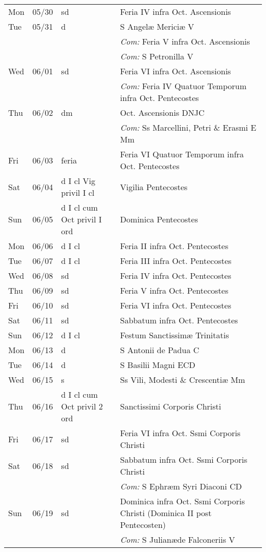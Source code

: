 \documentclass[10pt]{article}
\begin{document}
\begin{longtable}{ l l l l }
Mon & 05/30 & sd & Feria IV infra Oct. Ascensionis\\
Tue & 05/31 & d & S Angelæ Mericiæ V\\
 & & & \textit{Com:} Feria V infra Oct. Ascensionis\\
 & & & \textit{Com:} S Petronilla V\\
Wed & 06/01 & sd & Feria VI infra Oct. Ascensionis\\
 & & & \textit{Com:} Feria IV Quatuor Temporum infra Oct. Pentecostes\\
Thu & 06/02 & dm & Oct. Ascensionis DNJC\\
 & & & \textit{Com:} Ss Marcellini, Petri \& Erasmi E Mm\\
Fri & 06/03 & feria & Feria VI Quatuor Temporum infra Oct. Pentecostes\\
Sat & 06/04 & d I cl Vig privil I cl & Vigilia Pentecostes\\
Sun & 06/05 & d I cl cum Oct privil I ord & Dominica Pentecostes\\
Mon & 06/06 & d I cl & Feria II infra Oct. Pentecostes\\
Tue & 06/07 & d I cl & Feria III infra Oct. Pentecostes\\
Wed & 06/08 & sd & Feria IV infra Oct. Pentecostes\\
Thu & 06/09 & sd & Feria V infra Oct. Pentecostes\\
Fri & 06/10 & sd & Feria VI infra Oct. Pentecostes\\
Sat & 06/11 & sd & Sabbatum infra Oct. Pentecostes\\
Sun & 06/12 & d I cl & Festum Sanctissimæ Trinitatis\\
Mon & 06/13 & d & S Antonii de Padua C\\
Tue & 06/14 & d & S Basilii Magni ECD\\
Wed & 06/15 & s & Ss Vili, Modesti \& Crescentiæ Mm\\
Thu & 06/16 & d I cl cum Oct privil 2 ord & Sanctissimi Corporis Christi\\
Fri & 06/17 & sd & Feria VI infra Oct. Ssmi Corporis Christi\\
Sat & 06/18 & sd & Sabbatum infra Oct. Ssmi Corporis Christi\\
 & & & \textit{Com:} S Ephræm Syri Diaconi CD\\
Sun & 06/19 & sd & Dominica infra Oct. Ssmi Corporis Christi (Dominica II post Pentecosten)\\
 & & & \textit{Com:} S Julianæde Falconeriis V\\

\end{longtable}
\end{document}
